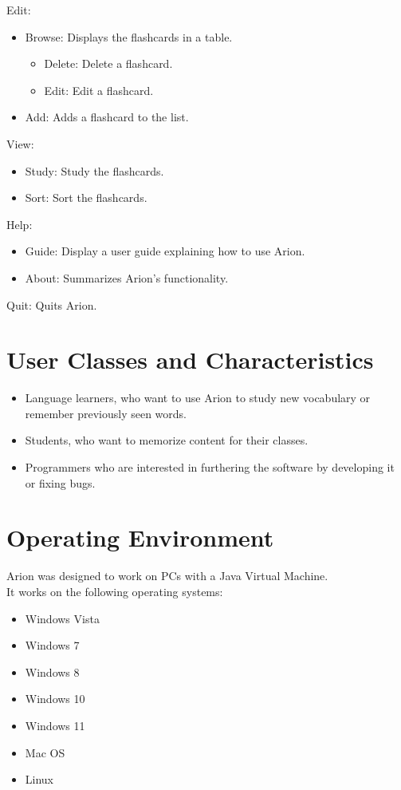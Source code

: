 \documentclass{scrreprt}
\begin{document}
Edit:
\begin{itemize}
    \item Browse: Displays the flashcards in a table.
    \begin{itemize}
        \item Delete: Delete a flashcard.
        \item Edit: Edit a flashcard.
    \end{itemize}
    \item Add: Adds a flashcard to the list.
\end{itemize}

View:
\begin{itemize}
    \item Study: Study the flashcards.
    \item Sort: Sort the flashcards.
\end{itemize}

Help:
\begin{itemize}
    \item Guide: Display a user guide explaining how to use Arion.
    \item About: Summarizes Arion's functionality.
\end{itemize}

Quit: Quits Arion.

\section{User Classes and Characteristics}
\begin{itemize}
    \item Language learners, who want to use Arion to study new vocabulary or remember previously seen words.
    \item Students, who want to memorize content for their classes.
    \item Programmers who are interested in furthering the software by developing it or fixing bugs.
\end{itemize}

\section{Operating Environment}

\begin{flushleft} %
    Arion was designed to work on PCs with a Java Virtual Machine. \\

    It works on the following operating systems: \\
    \begin{itemize}
        \item Windows Vista
        \item Windows 7
        \item Windows 8
        \item Windows 10
        \item Windows 11
        \item Mac OS
        \item Linux
    \end{itemize}
\end{flushleft}
\end{document}
